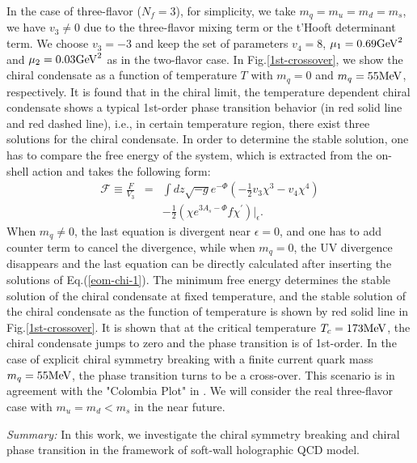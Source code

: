 \documentclass[aps,prd,showpacs,preprintnumbers,twocolumn]{revtex4}
\begin{document}
In the case of three-flavor ($N_f=3$), for simplicity, we take $m_q=m_u=m_d=m_s$, we have $v_3\neq 0$ due to the three-flavor
mixing term or the t'Hooft determinant term. We choose
$v_3=-3$ and keep the set of parameters $v_4=8$, $\mu_1= 0.69 {\rm GeV}^2$ and $\mu_2= 0.03 {\rm GeV}^2$ as in the
two-flavor case. In Fig.\ref{1st-crossover}, we show the chiral condensate as a function of temperature $T$ with $m_q=0$ and
$m_q=55 {\rm MeV}$, respectively. It is found that in the chiral limit, the temperature dependent chiral condensate shows a
typical 1st-order phase transition behavior (in red solid line and red dashed line), i.e., in certain temperature region,
there exist three solutions for the chiral condensate. In order to determine the stable solution, one has to compare the free energy
of the system, which is extracted from the on-shell action and takes the following form:
\begin{eqnarray}\label{freeenergy}
\mathcal{F}\equiv \frac{F}{V_3}
 &=&\int dz \sqrt{-g}e^{-\Phi}(-\frac{1}{2}v_3\chi^3-v_4 \chi^4)\nonumber\\
 & & -\frac{1}{2}(\chi e^{3A_s-\Phi}f\chi^{'})|_{\epsilon}.
\end{eqnarray}
When $m_q\neq0$, the last equation is divergent near $\epsilon=0$, and one has to add counter term to cancel the divergence, while when $m_q=0$, the UV divergence disappears and the last equation can be directly calculated after inserting the solutions of Eq.(\ref{eom-chi-1}). The minimum free energy
determines the stable solution of the chiral condensate at fixed temperature, and the stable solution of the chiral condensate
as the function of temperature is shown by red solid line in Fig.\ref{1st-crossover}. It is shown that at the critical temperature
$T_c=173 {\rm MeV}$, the chiral condensate jumps to zero and the phase transition is of 1st-order. In the case of explicit
chiral symmetry breaking with a finite current quark mass $m_q=55 {\rm MeV}$, the phase transition turns to be a cross-over.
This scenario is in agreement with the "Colombia Plot" in \cite{qcd-phase-diagram}.
We will consider the real three-flavor case with $m_u=m_d<m_s$ in the near future.

{\it Summary:} In this work, we investigate the chiral symmetry breaking and chiral phase transition in the framework
of soft-wall holographic QCD model.
\end{document}
